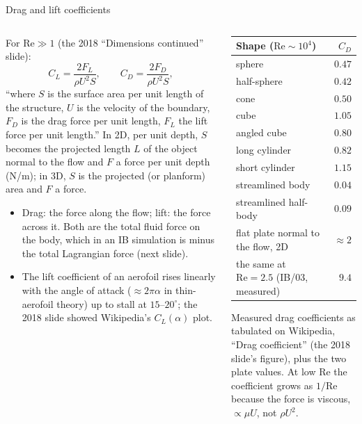 \documentclass[aspectratio=169,11pt]{beamer}
\begin{document}
\begin{frame}{Drag and lift coefficients}
\label{fr:cdcl}
\begin{columns}[T,onlytextwidth]
\begin{column}{0.54\textwidth}
\footnotesize For $\mathrm{Re} \gg 1$ (the 2018 ``Dimensions continued'' slide):
\[
  C_L = \frac{2F_L}{\rho U^2 S}, \qquad C_D = \frac{2F_D}{\rho U^2 S},
\]
``where $S$ is the surface area per unit length of the structure, $U$ is the velocity of the boundary, $F_D$ is the drag force per unit length, $F_L$ the lift force per unit length.'' In 2D, per unit depth, $S$ becomes the projected length $L$ of the object normal to the flow and $F$ a force per unit depth (N/m); in 3D, $S$ is the projected (or planform) area and $F$ a force.
\begin{itemize}
  \item Drag: the force along the flow; lift: the force across it. Both are the total fluid force on the body, which in an IB simulation is minus the total Lagrangian force (next slide).
  \item The lift coefficient of an aerofoil rises linearly with the angle of attack ($\approx 2\pi\alpha$ in thin-aerofoil theory) up to stall at $15$--$20^\circ$; the 2018 slide showed Wikipedia's $C_L(\alpha)$ plot.
\end{itemize}
\end{column}
\begin{column}{0.44\textwidth}
\scriptsize
\begin{tabular}{@{}L{0.5\textwidth}r@{}}
\toprule
Shape ($\mathrm{Re} \sim 10^4$) & $C_D$\\
\midrule
sphere & $0.47$\\
half-sphere & $0.42$\\
cone & $0.50$\\
cube & $1.05$\\
angled cube & $0.80$\\
long cylinder & $0.82$\\
short cylinder & $1.15$\\
streamlined body & $0.04$\\
streamlined half-body & $0.09$\\
\midrule
flat plate normal to the flow, 2D & $\approx 2$\\
the same at $\mathrm{Re} = 2.5$ (IB/03, measured) & $9.4$\\
\bottomrule
\end{tabular}

\vspace{1mm}
\scriptsize Measured drag coefficients as tabulated on Wikipedia, ``Drag coefficient'' (the 2018 slide's figure), plus the two plate values. At low $\mathrm{Re}$ the coefficient grows as $1/\mathrm{Re}$ because the force is viscous, $\propto \mu U$, not $\rho U^2$.
\end{column}
\end{columns}
\end{frame}
\end{document}
